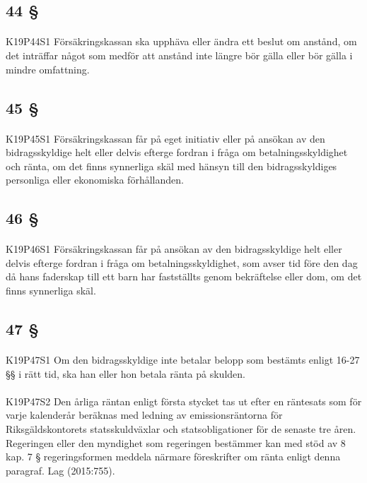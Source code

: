 \documentclass[a4paper,notitlepage,openany,10pt]{book}
\begin{document}
\subsection*{44 §}
\paragraph*{}
{\tiny K19P44S1}
Försäkringskassan ska upphäva eller ändra ett beslut om anstånd, om det inträffar något som medför att anstånd inte längre bör gälla eller bör gälla i mindre omfattning.
\subsection*{45 §}
\paragraph*{}
{\tiny K19P45S1}
Försäkringskassan får på eget initiativ eller på ansökan av den bidragsskyldige helt eller delvis efterge fordran i fråga om betalningsskyldighet och ränta, om det finns synnerliga skäl med hänsyn till den bidragsskyldiges personliga eller ekonomiska förhållanden.
\subsection*{46 §}
\paragraph*{}
{\tiny K19P46S1}
Försäkringskassan får på ansökan av den bidragsskyldige helt eller delvis efterge fordran i fråga om betalningsskyldighet, som avser tid före den dag då hans faderskap till ett barn har fastställts genom bekräftelse eller dom, om det finns synnerliga skäl.
\subsection*{47 §}
\paragraph*{}
{\tiny K19P47S1}
Om den bidragsskyldige inte betalar belopp som bestämts enligt 16-27 §§ i rätt tid, ska han eller hon betala ränta på skulden.
\paragraph*{}
{\tiny K19P47S2}
Den årliga räntan enligt första stycket tas ut efter en räntesats som för varje kalenderår beräknas med ledning av emissionsräntorna för Riksgäldskontorets statsskuldväxlar och statsobligationer för de senaste tre åren. Regeringen eller den myndighet som regeringen bestämmer kan med stöd av 8 kap. 7 § regeringsformen meddela närmare föreskrifter om ränta enligt denna paragraf.
Lag (2015:755).
\end{document}
